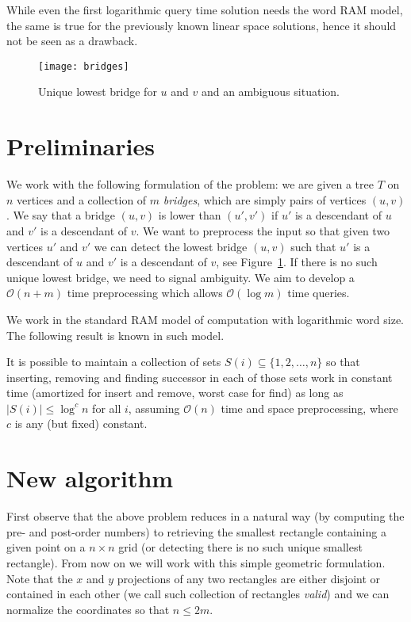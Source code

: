 \documentclass[runningheads]{llncs}
\begin{document}
While even the first logarithmic query time solution needs the word RAM model, the same is true for the previously known linear space solutions, hence it should not be seen as a drawback.

\begin{figure}[t]
\centering
\texttt{[image: bridges]}
\caption{Unique lowest bridge for $u$ and $v$ and an ambiguous situation.}
\label{figure:bridges}
\end{figure}

\section{Preliminaries}

We work with the following formulation of the problem: we are given a tree $T$ on $n$ vertices and a collection of $m$ \emph{bridges}, which are simply pairs of vertices $(u,v)$. We say that a bridge $(u,v)$ is lower than $(u',v')$ if $u'$ is a descendant of $u$ and $v'$ is a descendant of $v$. We want to preprocess the input so that given two vertices $u'$ and $v'$ we can detect the lowest bridge $(u,v)$ such that $u'$ is a descendant of $u$ and $v'$ is a descendant of $v$, see Figure~\ref{figure:bridges}. If there is no such unique lowest bridge, we need to signal ambiguity. We aim to develop a $\mathcal{O}(n+m)$ time preprocessing which allows $\mathcal{O}(\log m)$ time queries.

We work in the standard RAM model of computation with logarithmic word size. The following result is known in such model.

\begin{lemma}\label{lemma:atomic}
It is possible to maintain a collection of sets $S(i)\subseteq\{1,2,\ldots,n\}$ so that inserting, removing and finding successor in each of those sets work in constant time (amortized for insert and remove, worst case for find) as long as $|S(i)|\leq\log^{c} n$ for all $i$, assuming $\mathcal{O}(n)$ time and space preprocessing, where $c$ is any (but fixed) constant.
\end{lemma} 

\section{New algorithm}
\label{section:algorithm}

First observe that the above problem reduces in a natural way (by computing the pre- and post-order numbers) to retrieving the smallest rectangle containing a given point on a $n\times n$ grid (or detecting there is no such unique smallest rectangle). From now on we will work with this simple geometric formulation. Note that the $x$ and $y$ projections of any two rectangles are either disjoint or contained in each other (we call such collection of rectangles {\it valid}) and we can normalize the coordinates so that $n\leq 2m$.
\end{document}
